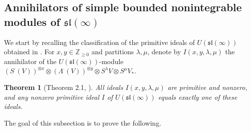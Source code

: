 \documentclass[12pt]{amsart}
\newcommand{\Z}{{\mathbb Z}}
\def\Z{\mathbb{Z}}
\newtheorem{thm}{Theorem}[section]
\begin{document}
\subsection{Annihilators of simple bounded nonintegrable modules of $\mathfrak{sl} (\infty)$}

We start by recalling the classification of the primitive  ideals of  $U(\mathfrak{sl} (\infty))$ obtained in \cite{PP}. For $x,y \in \Z_{\geq 0}$ and partitions $\lambda, \mu$, denote by $I(x,y,\lambda, \mu)$ the annihilator of the  $U(\mathfrak{sl} (\infty))$-module $(S^{\cdot} (V))^{\otimes x} \otimes (\Lambda^{\cdot}(V))^{\otimes y} \otimes S^{\lambda} V \otimes S^{\mu} V_*$.




\begin{thm}[Theorem 2.1, \cite{PP}]
All ideals  $I(x,y,\lambda, \mu)$ are primitive and nonzero, and any nonzero primitive
ideal $I$ of $U(\mathfrak{sl} (\infty))$  equals exactly one of these ideals.
\end{thm}


The goal of this subsection is to prove the following.
\end{document}
